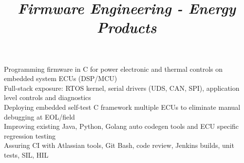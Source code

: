 \documentclass[mm]{res}
\begin{document}
\begin{resume}
\title{\textsl{Firmware Engineering - Energy Products}}
\begin{position}
\tb Programming firmware in C for power electronic and thermal controls on embedded system ECUs (DSP/MCU) \\
\tb Full-stack exposure: RTOS kernel, serial drivers (UDS, CAN, SPI), application level controls and diagnostics \\
\tb Deploying embedded self-test C framework multiple ECUs to eliminate manual debugging at EOL/field \\
\tb Improving existing Java, Python, Golang auto codegen tools and ECU specific regression testing \\
\tb Assuring CI with Atlassian tools, Git Bash, code review, Jenkins builds, unit tests, SIL, HIL
\end{position}


\end{resume}
\end{document}
